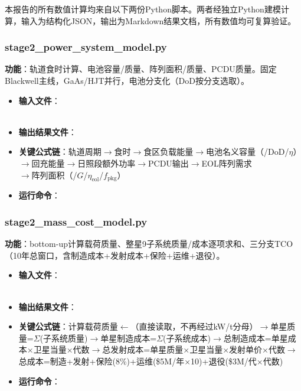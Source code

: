 本报告的所有数值计算均来自以下两份Python脚本。两者经独立Python建模计算，输入为结构化JSON，输出为Markdown结果文档，所有数值均可复算验证。

\subsubsection{stage2\_power\_system\_model.py}

\textbf{功能}：轨道食时计算、电池容量/质量、阵列面积/质量、PCDU质量。固定Blackwell主线，GaAs/HJT并行，电池分支化（DoD按分支选取）。

\begin{itemize}
  \item \textbf{输入文件}：\\
    \\
  \item \textbf{输出结果文件}：\\
  \item \textbf{关键公式链}：轨道周期$\to$食时$\to$食区负载能量$\to$电池名义容量（/DoD/$\eta$）\\
     $\to$回充能量$\to$日照段额外功率$\to$PCDU输出$\to$EOL阵列需求\\
     $\to$阵列面积（/$G$/$\eta_{\text{eol}}$/$f_{\text{pkg}}$）
  \item \textbf{运行命令}：
\end{itemize}

\subsubsection{stage2\_mass\_cost\_model.py}

\textbf{功能}：bottom-up计算载荷质量、整星9子系统质量/成本逐项求和、三分支TCO（10年总窗口，含制造成本+发射成本+保险+运维+退役）。

\begin{itemize}
  \item \textbf{输入文件}：\\
    \\
  \item \textbf{输出结果文件}：\\
  \item \textbf{关键公式链}：计算载荷质量$\gets$（直接读取，不再经过kW/t分母）$\to$单星质量=$\Sigma$(子系统质量)$\to$单星制造成本=$\Sigma$(子系统成本)$\to$总制造成本=单星成本$\times$卫星当量$\times$代数$\to$总发射成本=单星质量$\times$卫星当量$\times$发射单价$\times$代数$\to$总成本=制造+发射+保险(8\%)+运维(\$5M/年$\times$10)+退役(\$3M/代$\times$代数)
  \item \textbf{运行命令}：
\end{itemize}

